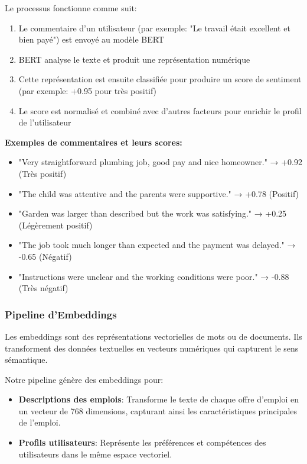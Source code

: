 \documentclass[12pt,a4paper]{article}
\begin{document}
Le processus fonctionne comme suit:
\begin{enumerate}
    \item Le commentaire d'un utilisateur (par exemple: "Le travail était excellent et bien payé") est envoyé au modèle BERT
    \item BERT analyse le texte et produit une représentation numérique
    \item Cette représentation est ensuite classifiée pour produire un score de sentiment (par exemple: +0.95 pour très positif)
    \item Le score est normalisé et combiné avec d'autres facteurs pour enrichir le profil de l'utilisateur
\end{enumerate}

\begin{examplebox}
\textbf{Exemples de commentaires et leurs scores:}
\begin{itemize}
    \item "Very straightforward plumbing job, good pay and nice homeowner." → +0.92 (Très positif)
    \item "The child was attentive and the parents were supportive." → +0.78 (Positif)
    \item "Garden was larger than described but the work was satisfying." → +0.25 (Légèrement positif)
    \item "The job took much longer than expected and the payment was delayed." → -0.65 (Négatif)
    \item "Instructions were unclear and the working conditions were poor." → -0.88 (Très négatif)
\end{itemize}
\end{examplebox}

\subsubsection{Pipeline d'Embeddings}
\begin{definitionbox}[title=Embeddings]
Les embeddings sont des représentations vectorielles de mots ou de documents. Ils transforment des données textuelles en vecteurs numériques qui capturent le sens sémantique.
\end{definitionbox}

Notre pipeline génère des embeddings pour:
\begin{itemize}
    \item \textbf{Descriptions des emplois}: Transforme le texte de chaque offre d'emploi en un vecteur de 768 dimensions, capturant ainsi les caractéristiques principales de l'emploi.
    \item \textbf{Profils utilisateurs}: Représente les préférences et compétences des utilisateurs dans le même espace vectoriel.
\end{itemize}
\end{document}
